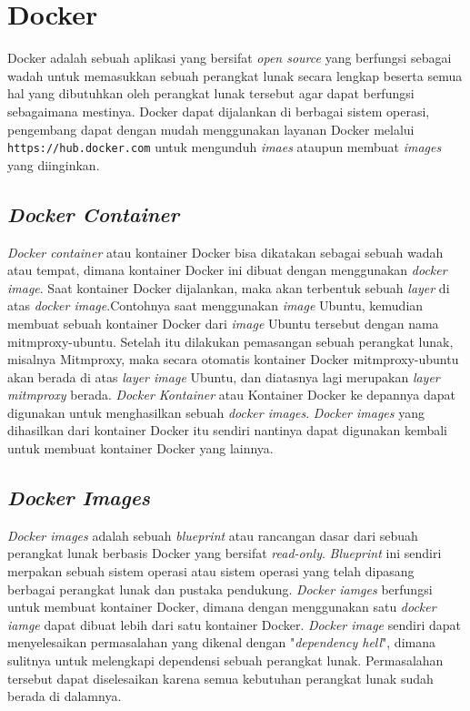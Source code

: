 \section{Docker}
Docker adalah sebuah aplikasi yang bersifat \textit{open source} yang berfungsi sebagai wadah untuk memasukkan sebuah perangkat lunak secara lengkap beserta semua hal yang dibutuhkan oleh perangkat lunak tersebut agar dapat berfungsi sebagaimana mestinya. Docker dapat dijalankan di berbagai sistem operasi, pengembang dapat dengan mudah menggunakan layanan Docker melalui \texttt{https://hub.docker.com} untuk mengunduh \textit{imaes} ataupun membuat \textit{images} yang diinginkan. \cite{bab2-docker}

\subsection{\textit{Docker Container}}
\textit{Docker container} atau kontainer Docker bisa dikatakan sebagai sebuah wadah atau tempat, dimana kontainer Docker ini dibuat dengan menggunakan \textit{docker image}. \cite{bab2-docker-container} Saat kontainer Docker dijalankan, maka akan terbentuk sebuah \textit{layer} di atas \textit{docker image}.Contohnya saat menggunakan \textit{image} Ubuntu, kemudian membuat sebuah kontainer Docker dari \textit{image} Ubuntu tersebut dengan nama mitmproxy-ubuntu. Setelah itu dilakukan pemasangan sebuah perangkat lunak, misalnya Mitmproxy, maka secara otomatis kontainer Docker mitmproxy-ubuntu akan berada di atas \textit{layer image} Ubuntu, dan diatasnya lagi merupakan \textit{layer mitmproxy} berada. \textit{Docker Kontainer} atau Kontainer Docker ke depannya dapat digunakan untuk menghasilkan sebuah \textit{docker images}. \textit{Docker images} yang dihasilkan dari kontainer Docker itu sendiri nantinya dapat digunakan kembali untuk membuat kontainer Docker yang lainnya.

\subsection{\textit{Docker Images}}
\textit{Docker images} adalah sebuah \textit{blueprint} atau rancangan dasar dari sebuah perangkat lunak berbasis Docker yang bersifat \textit{read-only}. \textit{Blueprint} ini sendiri merpakan sebuah sistem operasi atau sistem operasi yang telah dipasang berbagai perangkat lunak dan pustaka pendukung. \textit{Docker iamges} berfungsi untuk membuat kontainer Docker, dimana dengan menggunakan satu \textit{docker iamge} dapat dibuat lebih dari satu kontainer Docker. \textit{Docker image} sendiri dapat menyelesaikan permasalahan yang dikenal dengan "\textit{dependency hell}", dimana sulitnya untuk melengkapi dependensi sebuah perangkat lunak. Permasalahan tersebut dapat diselesaikan karena semua kebutuhan perangkat lunak sudah berada di dalamnya.

